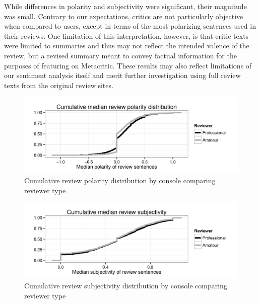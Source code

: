 \documentclass[letterpaper]{article}
\begin{document}
While differences in polarity and subjectivity were significant, their magnitude was small. Contrary to our expectations, critics are not particularly objective when compared to users, except in terms of the most polarizing sentences used in their reviews. One limitation of this interpretation, however, is that critic texts were limited to summaries and thus may not reflect the intended valence of the review, but a revised summary meant to convey factual information for the purposes of featuring on Metacritic. These results may also reflect limitations of our sentiment analysis itself and merit further investigation using full review texts from the original review sites.


\begin{figure}[tb]
\centering
\includegraphics[width=\linewidth]{./console_reviews_polarity_ecdf}
\caption{Cumulative review polarity distribution by console comparing reviewer type}
\label{fig:revpol_density}
\end{figure}


\begin{figure}[tb]
\centering
\includegraphics[width=\linewidth]{./console_reviews_subjectivity_ecdf}
\caption{Cumulative review subjectivity distribution by console comparing reviewer type}
\label{fig:revsubj_density}
\end{figure}
\end{document}
